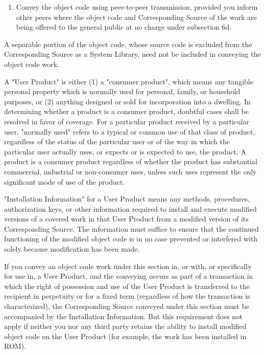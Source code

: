 \documentclass{ctexart}
\begin{document}
\begin{enumerate}
    
  \item  Convey the object code using peer-to-peer transmission, provided
    you inform other peers where the object code and Corresponding
    Source of the work are being offered to the general public at no
    charge under subsection 6d.
\end{enumerate}

  A separable portion of the object code, whose source code is excluded
from the Corresponding Source as a System Library, need not be
included in conveying the object code work.

  A "User Product" is either (1) a "consumer product", which means any
tangible personal property which is normally used for personal, family,
or household purposes, or (2) anything designed or sold for incorporation
into a dwelling.  In determining whether a product is a consumer product,
doubtful cases shall be resolved in favor of coverage.  For a particular
product received by a particular user, "normally used" refers to a
typical or common use of that class of product, regardless of the status
of the particular user or of the way in which the particular user
actually uses, or expects or is expected to use, the product.  A product
is a consumer product regardless of whether the product has substantial
commercial, industrial or non-consumer uses, unless such uses represent
the only significant mode of use of the product.

  "Installation Information" for a User Product means any methods,
procedures, authorization keys, or other information required to install
and execute modified versions of a covered work in that User Product from
a modified version of its Corresponding Source.  The information must
suffice to ensure that the continued functioning of the modified object
code is in no case prevented or interfered with solely because
modification has been made.

  If you convey an object code work under this section in, or with, or
specifically for use in, a User Product, and the conveying occurs as
part of a transaction in which the right of possession and use of the
User Product is transferred to the recipient in perpetuity or for a
fixed term (regardless of how the transaction is characterized), the
Corresponding Source conveyed under this section must be accompanied
by the Installation Information.  But this requirement does not apply
if neither you nor any third party retains the ability to install
modified object code on the User Product (for example, the work has
been installed in ROM).
\end{document}
